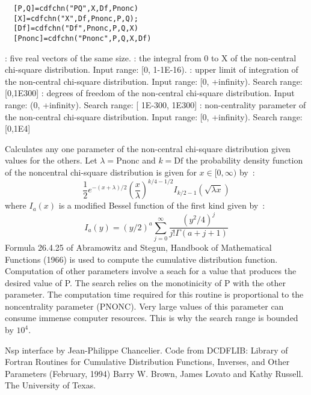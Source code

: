 \begin{mandesc}
\end{mandesc}
\label{cdfchn}
\begin{calling_sequence}
\begin{verbatim}
  [P,Q]=cdfchn("PQ",X,Df,Pnonc)  
  [X]=cdfchn("X",Df,Pnonc,P,Q);  
  [Df]=cdfchn("Df",Pnonc,P,Q,X)  
  [Pnonc]=cdfchn("Pnonc",P,Q,X,Df)  
\end{verbatim}
\end{calling_sequence}
\begin{parameters}
  \begin{varlist}
    : five real vectors of the same size.
    :  the integral from 0 to X of the non-central chi-square distribution. 
    Input range: [0, 1-1E-16).
      : upper limit of integration of the non-central chi-square distribution. Input range: [0, +infinity). Search range: [0,1E300]
        : degrees of freedom of the non-central chi-square distribution. Input range: (0, +infinity). Search range: [ 1E-300, 1E300]
        :  non-centrality parameter of the non-central chi-square distribution. Input range: [0, +infinity). Search range: [0,1E4]
  \end{varlist}
\end{parameters}

\begin{mandescription}
  Calculates any one parameter of the non-central chi-square
  distribution given values for the others. Let $\lambda = \mbox{Pnonc}$ and 
  $k = \mbox{Df}$ the probability density function of the noncentral chi-square 
  distribution is given for $x\in [0,\infty)$  by~:
  \begin{equation} 
    \frac{1}{2}e^{-(x+\lambda)/2}\left (\frac{x}{\lambda} \right)^{k/4-1/2} I_{k/2-1}(\sqrt{\lambda x})
  \end{equation}
  where $I_a(x)$ is a modified Bessel function of the first kind given by~:
  \begin{equation} 
      I_a(y) = (y/2)^a \sum_{j=0}^\infty \frac{ (y^2/4)^j}{j! \Gamma(a+j+1)} 
  \end{equation}
  Formula  26.4.25 of Abramowitz and Stegun,
  Handbook  of Mathematical  Functions (1966) is used to compute the cumulative
  distribution function.
  Computation of other parameters involve a seach for a value that
  produces  the desired  value  of P.   The search relies  on  the
  monotinicity of P with the other parameter.
  The computation time  required for this  routine is proportional
  to the noncentrality  parameter  (PNONC).  Very large  values of
  this parameter can consume immense  computer resources.  This is
  why the search range is bounded by $10^4$.
\end{mandescription}

\begin{authors}
  Nsp interface by Jean-Philippe Chancelier. Code from DCDFLIB: 
  Library of Fortran Routines for Cumulative Distribution
  Functions, Inverses, and Other Parameters (February, 1994)
  Barry W. Brown, James Lovato and Kathy Russell. The University of Texas.
\end{authors}
